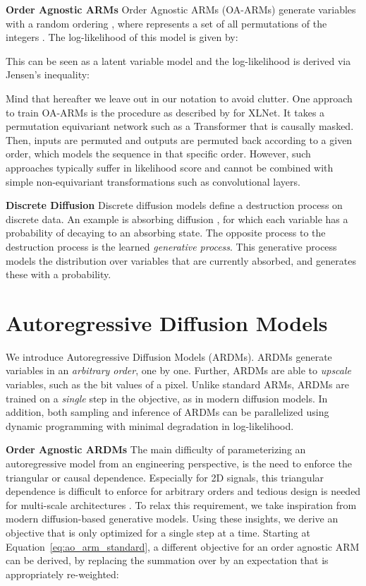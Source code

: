 \documentclass{article} \usepackage{iclr2022_conference,times}
\begin{document}
\textbf{Order Agnostic ARMs} \hspace{.2cm}
\noindent Order Agnostic ARMs (OA-ARMs) \citep{uria2014adeeptractable} generate variables with a random ordering , where  represents a set of all permutations of the integers . The log-likelihood of this model is given by: 

This can be seen as a latent variable model and the log-likelihood is derived via Jensen's inequality:
 
Mind that hereafter we leave out  in our notation to avoid clutter.
One approach to train OA-ARMs is the procedure as described by \citet{yang2019xlnet} for XLNet. It takes a permutation equivariant network such as a Transformer that is causally masked. Then, inputs are permuted and outputs are permuted back according to a given order, which models the sequence in that specific order. However, such approaches typically suffer in likelihood score and cannot be combined with simple non-equivariant transformations such as convolutional layers.

\textbf{Discrete Diffusion} \hspace{.2cm}
Discrete diffusion models define a destruction process on discrete data. An example is absorbing diffusion \citep{austin2021structured}, for which each variable has a probability of decaying to an absorbing state. The opposite process to the destruction process is the learned \textit{generative process}. This generative process models the distribution over variables that are currently absorbed, and generates these with a probability.

 
\section{Autoregressive Diffusion Models}
\label{sec:autoregressive_diffusion_models}
We introduce Autoregressive Diffusion Models (ARDMs). ARDMs generate variables in an \textit{arbitrary order}, one by one. Further, ARDMs are able to \textit{upscale} variables, such as the bit values of a pixel. Unlike standard ARMs, ARDMs are trained on a \textit{single} step in the objective, as in modern diffusion models. In addition, both sampling and inference of ARDMs can be parallelized using dynamic programming with minimal degradation in log-likelihood. 

\textbf{Order Agnostic ARDMs} \hspace{.2cm} The main difficulty of parameterizing an autoregressive model from an engineering perspective, is the need to enforce the triangular or causal dependence. Especially for 2D signals, this triangular dependence is difficult to enforce for arbitrary orders \citep{jain2020locallymasked} and tedious design is needed for multi-scale architectures \citep{salimans2017pixelcnnpp}. To relax this requirement, we take inspiration from modern diffusion-based generative models. Using these insights, we derive an objective that is only optimized for a single step at a time. Starting at Equation~\ref{eq:ao_arm_standard}, a different objective for an order agnostic ARM can be derived, by replacing the summation over  by an expectation that is appropriately re-weighted:
\end{document}
